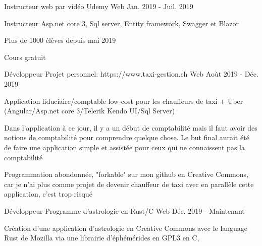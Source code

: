 

\begin{cventries}

  \cventry
    {Instructeur web par vidéo} %
    {Udemy} %
    {Web} %
    {Jan. 2019 - Juil. 2019} %
    {
      \begin{cvitems} %
        \item {Instructeur Asp.net core 3, Sql server, Entity framework, Swagger et Blazor}
        \item {Plus de 1000 élèves depuis mai 2019}
        \item {Cours gratuit}
      \end{cvitems}
    }

  \cventry
    {Développeur} %
    {Projet personnel: https://www.taxi-gestion.ch} %
    {Web} %
    {Aoùt 2019 - Déc. 2019} %
    {
      \begin{cvitems} %
        \item {Application fiduciaire/comptable low-cost pour les chauffeurs de taxi + Uber (Angular/Asp.net core 3/Telerik Kendo UI/Sql Server)}
        \item {Dans l'application à ce jour, il y a un début de comptabilité mais il faut avoir des notions de comptabilité pour comprendre quelque chose. Le but final aurait été de faire une application simple et assistée pour ceux qui ne connaissent pas la comptabilité}
        \item {Programmation abondonnée, "forkable" sur mon github en Creative Commons, car je n'ai plus comme projet de devenir chauffeur de taxi avec en parallèle cette application, c'est trop risqué}
      \end{cvitems}
    }

  \cventry
    {Développeur} %
    {Programme d'astrologie en Rust/C} %
    {Web} %
    {Déc. 2019 - Maintenant} %
    {
      \begin{cvitems} %
        \item {Création d'une application d'astrologie en Creative Commons avec le language Rust de Mozilla via une librairie d'éphémérides en GPL3 en C},
      \end{cvitems}
    }


\end{cventries}
